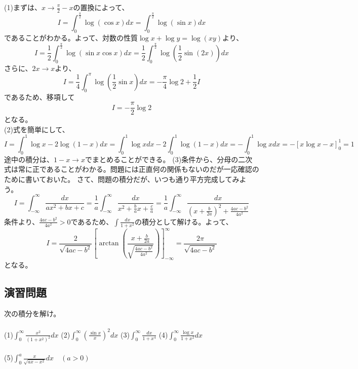 \documentclass[a4j,dvipdfmx]{jsarticle}
\begin{document}
(1)まずは、$x\to\frac{\pi}{2}-x$の置換によって、
\begin{equation*}
    I=\int_0^\frac{\pi}{2}\log(\cos x)dx=\int_0^\frac{\pi}{2}\log(\sin x)dx
\end{equation*}
であることがわかる。よって、対数の性質$\log x+\log y=\log(xy)$より、
\begin{equation*}
    I=\frac{1}{2}\int_0^\frac{\pi}{2}\log(\sin x\cos x)dx=\frac{1}{2}\int_0^\frac{\pi}{2}\log(\frac{1}{2}\sin(2x))dx
\end{equation*}
さらに、$2x\to x$より、
\begin{equation*}
    I=\frac{1}{4}\int_0^\pi \log(\frac{1}{2}\sin x)dx=-\frac{\pi}{4}\log 2+\frac{1}{2}I
\end{equation*}
であるため、移項して
\begin{equation*}
    I=-\frac{\pi}{2}\log 2
\end{equation*}
となる。\\

(2)式を簡単にして、
\begin{equation*}
    I=\int_0^1 \log x -2\log(1-x)dx=\int_0^1 \log x dx -2\int_0^1 \log(1-x)dx=-\int_0^1\log xdx
    =-\left[x\log x- x\right]_0^1=1
\end{equation*}
途中の積分は、$1-x\to x$でまとめることができる。
\newpage
(3)条件から、分母の二次式は常に正であることがわかる。問題には正直何の関係もないのだが一応確認のために書いておいた。
さて、問題の積分だが、いつも通り平方完成してみよう。
\begin{equation*}
    I=\int_{-\infty}^{\infty}\frac{dx}{ax^2+bx+c}=\frac{1}{a}\int_{-\infty}^{\infty}\frac{dx}{x^2+\frac{b}{a}x+\frac{c}{a}}=\frac{1}{a}\int_{-\infty}^{\infty}\frac{dx}{(x+\frac{b}{2a})^2+\frac{4ac-b^2}{4a^2}}
\end{equation*}
条件より、$\displaystyle\frac{4ac-b^2}{4a^2}>0$であるため、$\displaystyle \int\frac{dx}{1+x^2}$の積分として解ける。よって、
\begin{equation*}
    I=\frac{2}{\sqrt{4ac-b^2}}\left[\arctan\left(\frac{x+\frac{b}{2a}}{\sqrt{\frac{4ac-b^2}{4a^2}}}\right)\right]_{-\infty}^\infty=\frac{2\pi}{\sqrt{4ac-b^2}}
\end{equation*}
となる。
\newpage
\subsection{演習問題}
次の積分を解け。\\\\
(1)$\displaystyle \int_0^\infty \frac{x^2}{(1+x^2)^2}dx$
\hspace{15mm}
(2)$\displaystyle \int_0^\infty \left(\frac{\sin x}{x}\right)^2 dx$
\hspace{15mm}
(3)$\displaystyle \int_0^\infty \frac{dx}{1+x^4}$
\hspace{15mm}
(4)$\displaystyle \int_0^\infty \frac{\log x}{1+x^2}dx$
\\\\
(5)$\displaystyle \int_0^a \frac{x}{\sqrt{ax-x^2}}dx\quad(a>0)$
\\
\end{document}
